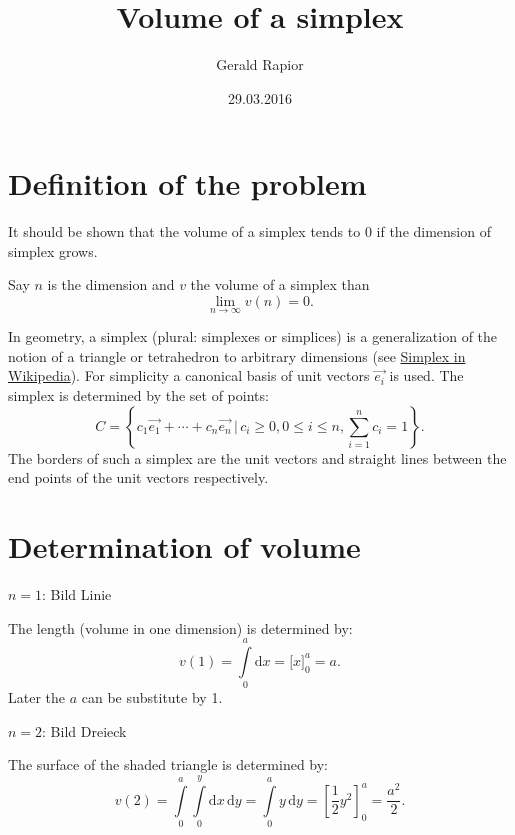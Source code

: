 \documentclass[11pt,paper=a4,oneside,ngerman,english,parskip=half]{scrartcl}
\title{Volume of a simplex}
\author{Gerald Rapior}
\date{29.03.2016}
\begin{document}
\maketitle

\section{Definition of the problem}
\label{sec:DefProblem}

It should be shown that the volume of a simplex tends to 0 if the dimension of simplex grows.

Say $n$ is the dimension and $v$ the volume of a simplex than
\begin{equation}
\lim_{n\rightarrow\infty} v(n) = 0.
\end{equation}

In geometry, a simplex (plural: simplexes or simplices) is a generalization of the notion of a triangle or tetrahedron to arbitrary dimensions (see \href{https://en.wikipedia.org/wiki/Simplex}{Simplex in Wikipedia}).
For simplicity a canonical basis of unit vectors $\vec{e_i}$ is used. The simplex is determined by the set of points:
\begin{equation}
C = \left\{ c_1 \vec{e_1} + \cdots + c_n \vec{e_n}\,|\,c_i\geq 0, 0 \leq i \leq n, \sum_{i=1}^{n} c_i = 1 \right\}.
\end{equation}
The borders of such a simplex are the unit vectors and straight lines between the end points of the unit vectors respectively.


\section{Determination of volume}

$n = 1$:
Bild Linie

The length (volume in one dimension) is determined by:
\begin{equation}
v(1) = \int\limits_{0}^{a}\text{d}x =\biggl[x\biggl]_{0}^{a} = a.
\end{equation}
Later the $a$ can be substitute by 1.

$n = 2$:
Bild Dreieck

The surface of the shaded triangle is determined by:
\begin{equation*}
v(2) = \int\limits_{0}^{a} \int\limits_{0}^{y} \text{d}x\,\text{d}y  = \int\limits_{0}^{a} y \,\text{d}y = \left[\frac{1}{2}y^2\right]_{0}^{a} = \frac{a^2}{2}.
\end{equation*}
\end{document}
